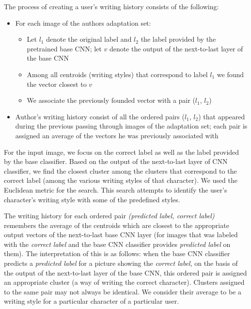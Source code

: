 \documentclass{article}
\begin{document}
The process of creating a user's writing history consists of the following: %
\begin{itemize}
  \item For each image of the authors adaptation set: 
  \begin{itemize}
    \item Let $l_1$ denote the original label and $l_2$ the label provided by the pretrained base CNN; 
    let $v$ denote the output of the next-to-last layer of the base CNN 
    \item Among all centroids (writing styles) that correspond to label $l_1$ we found the vector closest to $v$
    \item We associate the previously founded vector with a pair ($l_1$, $l_2$)
  \end{itemize}
  \item Author's writing history consist of all the ordered pairs ($l_1$, $l_2$) that appeared during the previous passing through images of the adaptation set; 
  each pair is assigned an average of the vectors he was previously associated with
  
\end{itemize}

For the input image, we focus on the correct label as well as the label provided by the base classifier.
Based on the output of the next-to-last layer of CNN classifier, we find the closest cluster among the clusters that correspond to the correct label (among the various writing styles of that character).
We used the Euclidean metric for the search. %
This search attempts to identify the user's character's writing style with some of the predefined styles.

The writing history for each ordered pair \textit{(predicted label, correct label)} remembers the average of the centroids 
which are closest to the appropriate output vectors of the next-to-last base CNN layer 
(for images that was labeled with the \textit{correct label} and the base CNN classifier provides \textit{predicted label} on them). 
The interpretation of this is as follows: when the base CNN classifier predicts %
 a \textit{predicted label} for a picture showing the \textit{correct label},
on the basis of the output of the next-to-last layer of the base CNN, this ordered pair is assigned an appropriate cluster (a way of writing the correct character). %
Clusters assigned to the same pair may not always be identical.
We consider their average to be a writing style for a particular character of a particular user.
\end{document}
